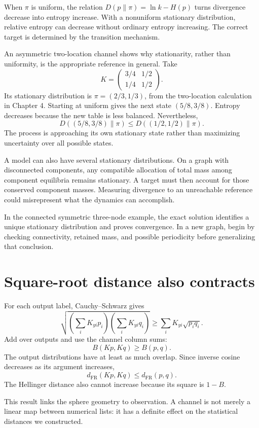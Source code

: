 \documentclass[11pt,oneside,openany]{book}
\theoremstyle{definition}
\theoremstyle{remark}
\numberwithin{equation}{chapter}
\begin{document}
When \(\pi\) is uniform, the relation \(D(p\|\pi)=\ln k-H(p)\) turns divergence decrease into entropy increase. With a nonuniform stationary distribution, relative entropy can decrease without ordinary entropy increasing. The correct target is determined by the transition mechanism.

An asymmetric two-location channel shows why stationarity, rather than uniformity, is the appropriate reference in general. Take \[K=\begin{pmatrix}3/4&1/2\\1/4&1/2\end{pmatrix}.\] Its stationary distribution is \(\pi=(2/3,1/3)\), from the two-location calculation in Chapter 4. Starting at uniform gives the next state \((5/8,3/8)\). Entropy decreases because the new table is less balanced. Nevertheless, \[D((5/8,3/8)\|\pi)\leq D((1/2,1/2)\|\pi).\] The process is approaching its own stationary state rather than maximizing uncertainty over all possible states.

A model can also have several stationary distributions. On a graph with disconnected components, any compatible allocation of total mass among component equilibria remains stationary. A target must then account for those conserved component masses. Measuring divergence to an unreachable reference could misrepresent what the dynamics can accomplish.

In the connected symmetric three-node example, the exact solution identifies a unique stationary distribution and proves convergence. In a new graph, begin by checking connectivity, retained mass, and possible periodicity before generalizing that conclusion.

\section{Square-root distance also contracts}\label{ch10-square-root-distance-also-contracts}

For each output label, Cauchy--Schwarz gives \[\sqrt{\left(\sum_iK_{yi}p_i\right)
\left(\sum_iK_{yi}q_i\right)}
\geq\sum_iK_{yi}\sqrt{p_iq_i}.\] Add over outputs and use the channel column sums: \[B(Kp,Kq)\geq B(p,q).\] The output distributions have at least as much overlap. Since inverse cosine decreases as its argument increases, \[\boxed{d_{\mathrm{FR}}(Kp,Kq)\leq d_{\mathrm{FR}}(p,q).}\] The Hellinger distance also cannot increase because its square is \(1-B\).

This result links the sphere geometry to observation. A channel is not merely a linear map between numerical lists: it has a definite effect on the statistical distances we constructed.
\end{document}
